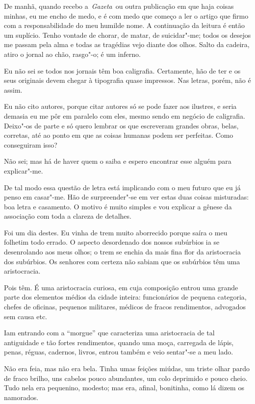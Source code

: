 De manhã, quando recebo a~\emph{Gazeta}~ou outra publicação em que haja
coisas minhas, eu me encho de medo, e é com medo que começo a ler o
artigo que firmo com a responsabilidade do meu humilde nome. A
continuação da leitura é então um suplício. Tenho vontade de chorar, de
matar, de suicidar"-me; todos os desejos me passam pela alma e todas as
tragédias vejo diante dos olhos. Salto da cadeira, atiro o jornal ao
chão, rasgo"-o; é um inferno.

Eu não sei se todos nos jornais têm boa caligrafia. Certamente, hão de
ter e os seus originais devem chegar à tipografia quase impressos. Nas
letras, porém, não é assim.

Eu não cito autores, porque citar autores só se pode fazer aos ilustres,
e seria demasia eu me pôr em paralelo com eles, mesmo sendo em negócio
de caligrafia. Deixo"-os de parte e só quero lembrar os que escreveram
grandes obras, belas, corretas, até ao ponto em que as coisas humanas
podem ser perfeitas. Como conseguiram isso?

Não sei; mas há de haver quem o saiba e espero encontrar esse alguém
para explicar"-me.

De tal modo essa questão de letra está implicando com o meu futuro que
eu já penso em casar"-me. Hão de surpreender"-se em ver estas duas coisas
misturadas: boa letra e casamento. O motivo é muito simples e vou
explicar a gênese da associação com toda a clareza de detalhes.

Foi um dia destes. Eu vinha de trem muito aborrecido porque saíra o meu
folhetim todo errado. O aspecto desordenado dos nossos subúrbios ia se
desenrolando aos meus olhos; o trem se enchia da mais fina flor da
aristocracia dos subúrbios. Os senhores com certeza não sabiam que os
subúrbios têm uma aristocracia.

Pois têm. É uma aristocracia curiosa, em cuja composição entrou uma
grande parte dos elementos médios da cidade inteira: funcionários de
pequena categoria, chefes de oficinas, pequenos militares, médicos de
fracos rendimentos, advogados sem causa etc.

Iam entrando com a ``morgue'' que caracteriza uma aristocracia de tal
antiguidade e tão fortes rendimentos, quando uma moça, carregada de
lápis, penas, réguas, cadernos, livros, entrou também e veio sentar"-se a
meu lado.

Não era feia, mas não era bela. Tinha umas feições miúdas, um triste
olhar pardo de fraco brilho, uns cabelos pouco abundantes, um colo
deprimido e pouco cheio. Tudo nela era pequenino, modesto; mas era,
afinal, bonitinha, como lá dizem os namorados.

